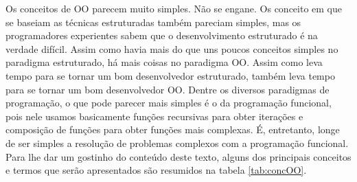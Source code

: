 Os conceitos de OO parecem muito simples. Não se engane. Os conceito em que se baseiam as técnicas estruturadas também pareciam simples, mas os programadores experientes sabem que o desenvolvimento estruturado é na verdade difícil. Assim como havia mais do que uns poucos conceitos simples no paradigma estruturado, há mais coisas no paradigma OO. Assim como leva tempo para se tornar um bom desenvolvedor estruturado, também leva tempo para se tornar um bom desenvolvedor OO. Dentre os diversos paradigmas de programação, o que pode parecer mais simples é o da programação funcional, pois nele usamos basicamente funções recursivas para obter iterações e composição de funções para obter funções mais complexas. É, entretanto, longe de ser simples a resolução de problemas complexos com a programação funcional. Para lhe dar um gostinho do conteúdo deste texto, alguns dos principais conceitos e termos que serão apresentados são resumidos na tabela \ref{tab:concOO}.

